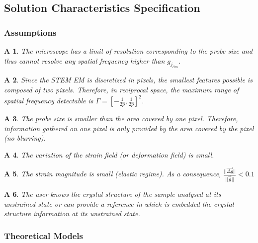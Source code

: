 \documentclass[12pt]{article}
\newtheorem{A}{A}
\begin{document}
\subsection{Solution Characteristics Specification}


\subsubsection{Assumptions}

\begin{A}
\normalfont The microscope has a limit of resolution corresponding to the probe size and thus cannot resolve any spatial frequency higher than $g_{j_{lim}}$. 
\label{A_1}
\end{A}
\begin{A}
\normalfont Since the STEM EM is discretized in pixels, the smallest features possible is composed of two pixels. Therefore, in reciprocal space, the maximum range of spatial frequency detectable is $\Gamma=[-\frac{1}{2p},\frac{1}{2p}]^{2}$.
\label{A_2}
\end{A}
\begin{A}
\normalfont The probe size is smaller than the area covered by one pixel. Therefore, information gathered on one pixel is only provided by the area covered by the pixel (no blurring).
\label{A_3}
\end{A}
\begin{A}
\normalfont The variation of the strain field (or deformation field) is small.
\label{A_4}
\end{A}
\begin{A}
\normalfont The strain magnitude is small (elastic regime). As a consequence, $\frac{||\vec{\Delta g}||}{||\vec{g}||}<0.1$
\label{A_5}
\end{A}
\begin{A}
\normalfont The user knows the crystal structure of the sample analysed at its unstrained state or can provide a reference in which is embedded the crystal structure information at its unstrained state.
\label{A_6}
\end{A}

\subsubsection{Theoretical Models}\label{sec_theoretical}
\end{document}
